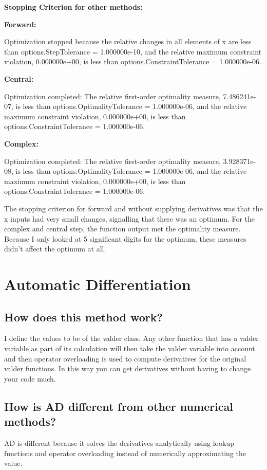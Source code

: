 \documentclass[a4paper]{article}
\begin{document}
\textbf{Stopping Criterion for other methods:}

\textbf{Forward:}

Optimization stopped because the relative changes in all elements of x are
less than options.StepTolerance = 1.000000e-10, and the relative maximum constraint
violation, 0.000000e+00, is less than options.ConstraintTolerance = 1.000000e-06.

\textbf{Central:}

Optimization completed: The relative first-order optimality measure, 7.486241e-07,
is less than options.OptimalityTolerance = 1.000000e-06, and the relative maximum constraint
violation, 0.000000e+00, is less than options.ConstraintTolerance = 1.000000e-06.

\textbf{Complex:}

Optimization completed: The relative first-order optimality measure, 3.928371e-08,
is less than options.OptimalityTolerance = 1.000000e-06, and the relative maximum constraint
violation, 0.000000e+00, is less than options.ConstraintTolerance = 1.000000e-06.

The stopping criterion for forward and without supplying derivatives was that the x inputs had very small changes, signalling that there was an optimum. 
For the complex and central step, the function output met the optimality measure. 
Because I only looked at 5 significant digits for the optimum, these measures didn't affect the optimum at all.

\section{Automatic Differentiation}
\subsection{How does this method work?}
I define the values to be of the valder class. 
Any other function that has a valder variable as part of its calculation will then take the valder variable  into account and then operator overloading is used to compute derivatives for the original valder functions.
In this way you can get derivatives without having to change your code much.
\subsection{How is AD different from other numerical methods?}
AD is different because it solves the derivatives analytically using lookup functions and operator overloading instead of numerically approximating the value.
\end{document}
